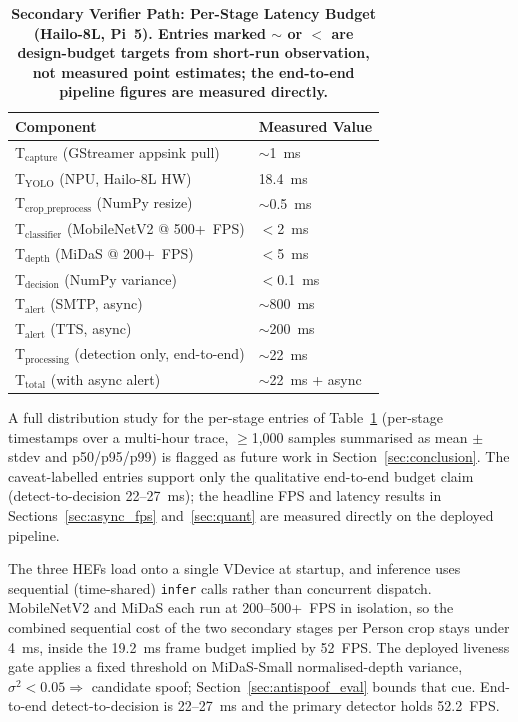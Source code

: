 \documentclass{ieeeaccess}
\begin{document}
\begin{table}[ht!]
\caption{\textbf{Secondary Verifier Path: Per-Stage Latency Budget (Hailo-8L, Pi~5). Entries marked $\sim$ or $<$ are design-budget targets from short-run observation, not measured point estimates; the end-to-end pipeline figures are measured directly.}}
\label{tab:cascade_latency}
\centering\small
\begin{tabular}{|l|l|}
\hline
\textbf{Component} & \textbf{Measured Value} \\
\hline
T$_{\text{capture}}$ (GStreamer appsink pull) & $\sim$1~ms \\
T$_{\text{YOLO}}$ (NPU, Hailo-8L HW) & 18.4~ms \\
T$_{\text{crop\_preprocess}}$ (NumPy resize) & $\sim$0.5~ms \\
T$_{\text{classifier}}$ (MobileNetV2 @ 500+~FPS) & $<$2~ms \\
T$_{\text{depth}}$ (MiDaS @ 200+~FPS) & $<$5~ms \\
T$_{\text{decision}}$ (NumPy variance) & $<$0.1~ms \\
T$_{\text{alert}}$ (SMTP, async) & $\sim$800~ms \\
T$_{\text{alert}}$ (TTS, async) & $\sim$200~ms \\
T$_{\text{processing}}$ (detection only, end-to-end) & $\sim$22~ms \\
T$_{\text{total}}$ (with async alert) & $\sim$22~ms + async \\
\hline
\end{tabular}
\end{table}

A full distribution study for the per-stage entries of Table~\ref{tab:cascade_latency} (per-stage timestamps over a multi-hour trace, $\geq$1{,}000 samples summarised as mean $\pm$ stdev and p50/p95/p99) is flagged as future work in Section~\ref{sec:conclusion}. The caveat-labelled entries support only the qualitative end-to-end budget claim (detect-to-decision 22--27~ms); the headline FPS and latency results in Sections~\ref{sec:async_fps} and~\ref{sec:quant} are measured directly on the deployed pipeline.

The three HEFs load onto a single VDevice at startup, and inference uses sequential (time-shared) \texttt{infer} calls rather than concurrent dispatch. MobileNetV2 and MiDaS each run at 200--500+~FPS in isolation, so the combined sequential cost of the two secondary stages per Person crop stays under 4~ms, inside the 19.2~ms frame budget implied by 52~FPS. The deployed liveness gate applies a fixed threshold on MiDaS-Small normalised-depth variance, $\sigma^2 < 0.05 \Rightarrow$ candidate spoof; Section~\ref{sec:antispoof_eval} bounds that cue. End-to-end detect-to-decision is 22--27~ms and the primary detector holds 52.2~FPS.
\end{document}
